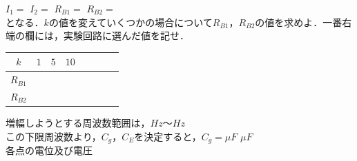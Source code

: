 \documentclass[10pt, a4j, dvipdfmx]{jarticle}
\begin{document}
    \hspace{7mm}$I_1 = $ \underline{\hspace{20mm}}\hspace{7mm}$I_2 = $ \underline{\hspace{20mm}}\hspace{7mm}$R_{B1} = $ \underline{\hspace{20mm}}$R_{B2} = $ \underline{\hspace{20mm}}\\
    となる．$k$の値を変えていくつかの場合について$R_{B1}$，$R_{B2}$の値を求めよ．一番右端の欄には，実験回路に選んだ値を記せ．
    \begin{table}[H]
        \begin{tabular}{||c||c|c|c|c|c|c||c||}
        \hline\hline
        $k$      & $1$           & $5$           & $10$          &               &               &               &               \\ \hline\hline
        $R_{B1}$ & \hspace{15mm} & \hspace{15mm} & \hspace{15mm} & \hspace{15mm} & \hspace{15mm} & \hspace{15mm} & \hspace{15mm} \\ \hline
        $R_{B2}$ &               &               &               &               &               &               &               \\ \hline\hline
        \end{tabular}
    \end{table}
    \newpage
    増幅しようとする周波数範囲は，\hspace{7mm}\underline{\hspace{20mm}}$Hz$〜\hspace{7mm}\underline{\hspace{20mm}}$Hz$\\
    この下限周波数より，$C_g$，$C_E$を決定すると，$C_g = $\underline{\hspace{20mm}}$\mu F$\hspace{7mm} \underline{\hspace{20mm}}$\mu F$\\
    各点の電位及び電圧
\end{document}
